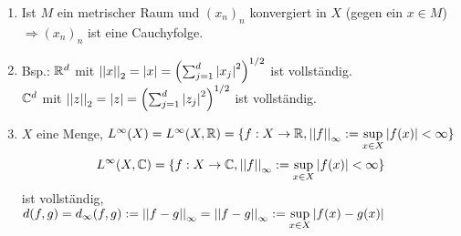 \documentclass[../ana2.tex]{subfiles}
\begin{document}
\begin{bem}\leavevmode
    \begin{enumerate}
        \item Ist \( M \) ein metrischer Raum 
        und \( (x_n)_n \) konvergiert in \( X \)
        (gegen ein \( x \in M \)) 
        \( \Rightarrow (x_n)_n \) ist eine 
        Cauchyfolge.
        \item Bsp.: \( \mathbb{R}^d \) mit \( \left|\left|x\right|\right|_2 = \left|x\right| 
        = \left( \sum_{j=1}^d \left|x_j\right|^2 \right)^{1/2} \)
        ist vollständig. \\
        \( \mathbb{C}^d \) mit \( \left|\left|z\right|\right|_2 = \left|z\right| 
        = \left( \sum_{j=1}^d \left|z_j\right|^2 \right)^{1/2} \)
        ist vollständig.
        \item \( X \) eine Menge, 
        \( L^\infty(X) = L^\infty(X, \mathbb{R}) 
        = \{ f:X\rightarrow \mathbb{R}, 
        \left|\left|f\right|\right|_\infty 
        := \underset{x \in X}{\sup} \left|f(x)\right| < \infty \} \)
        \[ L^\infty(X, \mathbb{C}) 
        = \{ f:X\rightarrow \mathbb{C}, 
        \left|\left|f\right|\right|_\infty 
        := \underset{x \in X}{\sup} \left|f(x)\right| < \infty \} \]
        ist vollständig, \( d(f,g) = d_\infty(f,g) 
        := \left|\left|f-g\right|\right|_\infty = \left|\left|f-g\right|\right|_\infty 
        := \underset{x\in X}{\sup} \left|f(x) - g(x)\right| \)
    \end{enumerate}
\end{bem}
\end{document}
